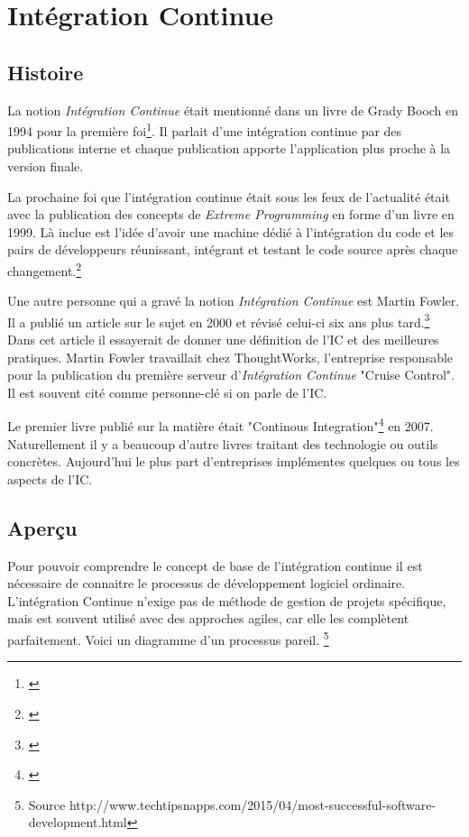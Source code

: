 \chapter{Intégration Continue}
\label{chap:integrationcontinue}

\section{Histoire}
La notion \textit{Intégration Continue} était mentionné dans un livre de Grady Booch en 1994 pour la première foi\footnote{\cite{boochooad}}. Il parlait d'une intégration continue par des publications interne et chaque publication apporte l'application plus proche à la version finale.

La prochaine foi que l'intégration continue était sous les feux de l'actualité était avec la publication des concepts de \textit{Extreme Programming} en forme d'un livre en 1999.
Là inclue est l'idée d'avoir une machine dédié à l'intégration du code et les pairs de développeurs réunissant, intégrant et testant le code source après chaque changement.\footnote{\cite{robertshistory}}

Une autre personne qui a gravé la notion \textit{Intégration Continue} est Martin Fowler. Il a publié un article sur le sujet en 2000 et révisé celui-ci six ans plus tard.\footnote{\cite{fowlerci}} Dans cet article il essayerait de donner une définition de l'IC et des meilleures pratiques. Martin Fowler travaillait chez ThoughtWorks, l'entreprise responsable pour la publication du première serveur d'\textit{Intégration Continue} "Cruise Control". Il est souvent cité comme personne-clé si on parle de l'IC.

Le premier livre publié sur la matière était "Continous Integration"\footnote{\cite{duvallconint}} en 2007. Naturellement il y a beaucoup d'autre livres traitant des technologie ou outils concrètes. Aujourd'hui le plus part d'entreprises implémentes quelques ou tous les aspects de l'IC.

\nocite{wikici}
\newpage

\section{Aperçu}
Pour pouvoir comprendre le concept de base de l'intégration continue il est nécessaire de connaitre le processus de développement logiciel ordinaire. L'intégration Continue n'exige pas de méthode de gestion de projets spécifique, mais est souvent utilisé avec des approches agiles, car elle les complètent parfaitement. Voici un diagramme d'un processus pareil. \footnote{Source http://www.techtipsnapps.com/2015/04/most-successful-software-development.html}

